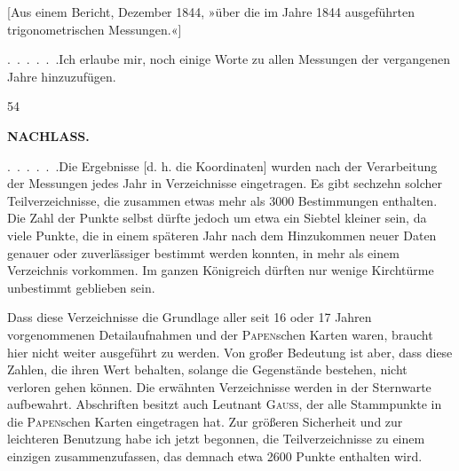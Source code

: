 \par\medskip
\begin{center}
[Aus einem Bericht, Dezember 1844, »über die im Jahre 1844 ausgeführten\\
trigonometrischen Messungen.«]
\end{center}

\par\noindent\hspace*{\parindent}\mbox{.\ .\ .\ .\ .\ .}\quad Ich erlaube mir, noch einige Worte zu allen Messungen der vergangenen Jahre hinzuzufügen.

\par\smallskip\noindent\hspace*{.03\linewidth}{\footnotesize IX.}\hfill{\footnotesize 54}\hspace*{.12\linewidth}\par

\par\clearpage
\noindent{}\hfill{\small\textbf{NACHLASS.}}\hfill\null\par\medskip

\par\noindent\hspace*{\parindent}\mbox{.\ .\ .\ .\ .\ .}\quad Die Ergebnisse [d. h. die Koordinaten] wurden nach der Verarbeitung der Messungen jedes Jahr in Verzeichnisse eingetragen. Es gibt sechzehn solcher Teilverzeichnisse, die zusammen etwas mehr als 3000 Bestimmungen enthalten. Die Zahl der Punkte selbst dürfte jedoch um etwa ein Siebtel kleiner sein, da viele Punkte, die in einem späteren Jahr nach dem Hinzukommen neuer Daten genauer oder zuverlässiger bestimmt werden konnten, in mehr als einem Verzeichnis vorkommen. Im ganzen Königreich dürften nur wenige Kirchtürme unbestimmt geblieben sein.

\par\noindent\hspace*{\parindent}Dass diese Verzeichnisse die Grundlage aller seit 16 oder 17 Jahren vorgenommenen Detailaufnahmen und der \textsc{Papen}schen Karten waren, braucht hier nicht weiter ausgeführt zu werden. Von großer Bedeutung ist aber, dass diese Zahlen, die ihren Wert behalten, solange die Gegenstände bestehen, nicht verloren gehen können. Die erwähnten Verzeichnisse werden in der Sternwarte aufbewahrt. Abschriften besitzt auch Leutnant \textsc{Gauss}, der alle Stammpunkte in die \textsc{Papen}schen Karten eingetragen hat. Zur größeren Sicherheit und zur leichteren Benutzung habe ich jetzt begonnen, die Teilverzeichnisse zu einem einzigen zusammenzufassen, das demnach etwa 2600 Punkte enthalten wird.

